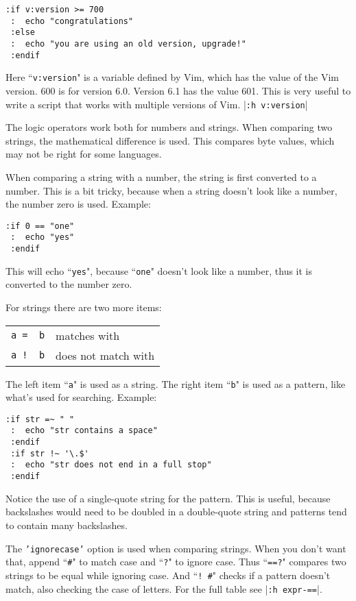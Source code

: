 \begin{Verbatim}[samepage=true]
 :if v:version >= 700
 :  echo "congratulations"
 :else
 :  echo "you are using an old version, upgrade!"
 :endif
\end{Verbatim}

Here ``\texttt{v:version}" is a variable defined by Vim, which has the value of the Vim version.
600 is for version 6.0.
Version 6.1 has the value 601.
This is very useful to write a script that works with multiple versions of Vim.
|\texttt{:h v:version}|

The logic operators work both for numbers and strings.
When comparing two strings, the mathematical difference is used.
This compares byte values, which may not be right for some languages.

When comparing a string with a number, the string is first converted to a number.
This is a bit tricky, because when a string doesn't look like a number, the number zero is used.
Example:

\begin{Verbatim}[samepage=true]
 :if 0 == "one"
 :  echo "yes"
 :endif
\end{Verbatim}

This will echo ``\texttt{yes}", because ``\texttt{one}" doesn't look like a number, thus it is converted to the number zero.

For strings there are two more items:
\begin{center} \begin{tabular}{c l}
				\texttt{a =~ b} & matches with \\
				\texttt{a !~ b} & does not match with \\
\end{tabular} \end{center}

The left item ``\texttt{a}" is used as a string.
The right item ``\texttt{b}" is used as a pattern, like what's used for searching.
Example:

\begin{Verbatim}[samepage=true]
 :if str =~ " "
 :  echo "str contains a space"
 :endif
 :if str !~ '\.$'
 :  echo "str does not end in a full stop"
 :endif
\end{Verbatim}

Notice the use of a single-quote string for the pattern.
This is useful, because backslashes would need to be doubled in a double-quote string and patterns tend to contain many backslashes.

The \texttt{'ignorecase'} option is used when comparing strings.
When you don't want that, append ``\texttt{\#}" to match case and ``\texttt{?}" to ignore case.
Thus ``\texttt{==?}" compares two strings to be equal while ignoring case.
And ``\texttt{!~\#}" checks if a pattern doesn't match, also checking the case of letters.
For the full table see |\texttt{:h expr-==}|.
